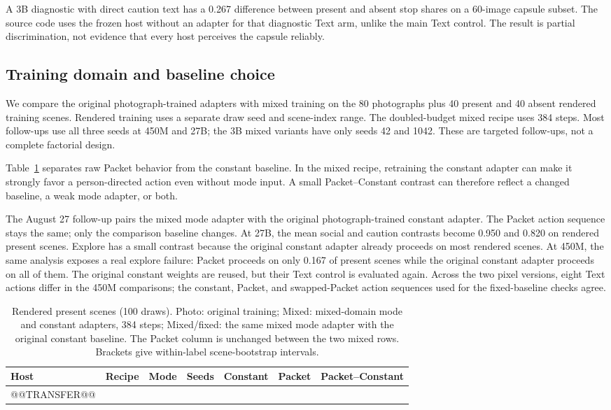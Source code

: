 \documentclass[10pt]{article}
\begin{document}
A 3B diagnostic with direct caution text has a 0.267 difference
between present and absent stop shares on a 60-image capsule
subset. The source code uses the frozen host without an adapter
for that diagnostic Text arm, unlike the main Text control.
The result is partial discrimination, not evidence that every
host perceives the capsule reliably.

\subsection{Training domain and baseline choice}
We compare the original photograph-trained adapters with mixed
training on the 80 photographs plus 40 present and 40 absent
rendered training scenes. Rendered training uses a separate draw
seed and scene-index range. The doubled-budget mixed recipe uses
384 steps. Most follow-ups use all three seeds at 450M and 27B;
the 3B mixed variants have only seeds 42 and 1042. These are
targeted follow-ups, not a complete factorial design.

Table~\ref{tab:transfer} separates raw Packet behavior from the
constant baseline. In the mixed recipe, retraining the constant
adapter can make it strongly favor a person-directed action even
without mode input. A small Packet--Constant contrast can therefore
reflect a changed baseline, a weak mode adapter, or both.

The August 27 follow-up pairs the mixed mode adapter with the
original photograph-trained constant adapter. The Packet action
sequence stays the same; only the comparison baseline changes.
At 27B, the mean social and caution contrasts become 0.950 and
0.820 on rendered present scenes. Explore has a small contrast
because the original constant adapter already proceeds on most
rendered scenes. At 450M, the same analysis exposes a real explore
failure: Packet proceeds on only 0.167 of present scenes while
the original constant adapter proceeds on all of them. The original
constant weights are reused, but their Text control is evaluated
again. Across the two pixel versions, eight Text actions differ
in the 450M comparisons; the constant, Packet, and swapped-Packet
action sequences used for the fixed-baseline checks agree.

\begin{table}[htbp]\centering\small
\caption{Rendered present scenes (100 draws). Photo: original training;
Mixed: mixed-domain mode and constant adapters, 384 steps;
Mixed/fixed: the same mixed mode adapter with the original constant
baseline. The Packet column is unchanged between the two mixed rows.
Brackets give within-label scene-bootstrap intervals.}\label{tab:transfer}
\begin{tabular}{lllrrrl}\toprule
Host & Recipe & Mode & Seeds & Constant & Packet & Packet--Constant\\\midrule
@@TRANSFER@@
\bottomrule\end{tabular}
\end{table}
\end{document}
